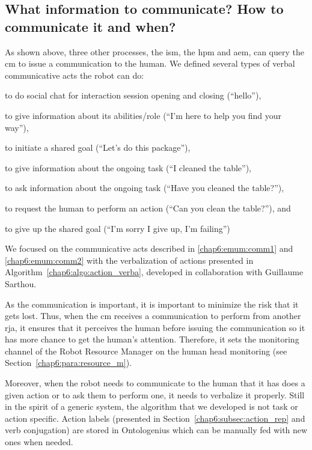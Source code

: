 \documentclass[a4paper,11pt,twoside]{StyleThese}
\begin{document}
\subsection{What information to communicate? How to communicate it and when?}\label{chap6:subsec:info_comm}
As shown above, three other processes, the \acrlong{ism}, the \acrlong{hpm} and \acrlong{aem}, can query the \acrshort{cm} to issue a communication to the human. We defined several types of verbal communicative acts the robot can do:
\begin{bulletList}
	\item to do social chat for interaction session opening and closing (\eg ``hello''),
	\item to give information about its abilities/role (\eg ``I'm here to help you find your way''),
	\item to initiate a shared goal (\eg ``Let's do this package''),
	\item to give information about the ongoing task (\eg ``I cleaned the table''),\label{chap6:emum:comm1}
	\item to ask information about the ongoing task (\eg ``Have you cleaned the table?''),
	\item to request the human to perform an action (\eg ``Can you clean the table?''), and\label{chap6:emum:comm2}
	\item to give up the shared goal (\eg ``I'm sorry I give up, I'm failing'')
\end{bulletList}

We focused on the communicative acts described in \ref{chap6:emum:comm1} and \ref{chap6:emum:comm2} with the verbalization of actions presented in Algorithm~\ref{chap6:algo:action_verba}, developed in collaboration with Guillaume Sarthou. 

As the communication is important, it is important to minimize the risk that it gets lost. Thus, when the \acrshort{cm} receives a communication to perform from another \acrshort{rja}, it ensures that it perceives the human before issuing the communication so it has more chance to get the human's attention. Therefore, it sets the monitoring channel of the Robot Resource Manager on the human head monitoring (see Section~\ref{chap6:para:resource_m}).

Moreover, when the robot needs to communicate to the human that it has does a given action or to ask them to perform one, it needs to verbalize it properly. Still in the spirit of a generic system, the algorithm that we developed is not task or action specific. Action labels (presented in Section~\ref{chap6:subsec:action_rep} and verb conjugation) are stored in Ontologenius which can be manually fed with new ones when needed.
\end{document}
